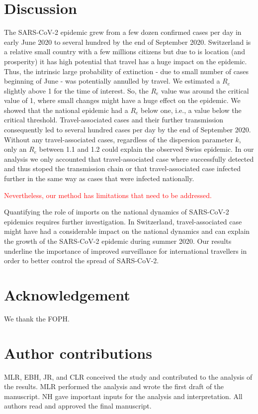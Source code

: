 \documentclass[10pt, a4paper, twoside]{article}
\begin{document}
\begin{multicols}{2}

\section{Discussion}
The SARS-CoV-2 epidemic grew from a few dozen confirmed cases per day in early June 2020 to several hundred by the end of September 2020. 
Switzerland is a relative small country with a few millions citizens but due to is location (and prosperity) it has high potential that travel has a huge impact on the epidemic. 
Thus, the intrinsic large probability of extinction - due to small number of cases beginning of June - was potentially annulled by travel. 
We estimated a $R_e$ slightly above 1 for the time of interest. So, the $R_e$ value was around the critical value of 1, where small changes might have a huge effect on the epidemic. 
We showed that the national epidemic had a $R_e$ below one, i.e., a value below the critical threshold. 
Travel-associated cases and their further transmission consequently led to several hundred cases per day by the end of September 2020. 
Without any travel-associated cases, regardless of the dispersion parameter $k$, only an $R_e$ between 1.1 and 1.2 could explain the observed Swiss epidemic. 
In our analysis we only accounted that travel-associated case where successfully detected and thus stoped the transmission chain or that travel-associated case infected further in the same way as cases that were infected nationally.

\textcolor{red}{Nevertheless, our method has limitations that need to be addressed.}

Quantifying the role of imports on the national dynamics of SARS-CoV-2 epidemics requires further investigation. 
In Switzerland, travel-associated case might have had a considerable impact on the national dynamics and can explain the growth of the SARS-CoV-2 epidemic during summer 2020. 
Our results underline the importance of improved surveillance for international travellers in order to better control the spread of SARS-CoV-2.

\section{Acknowledgement}
We thank the FOPH.

\section{Author contributions}
MLR, EBH, JR, and CLR conceived the study and contributed to the analysis of the results. MLR performed the analysis and wrote the first draft of the manuscript. NH gave important inputs for the analysis and interpretation. All authors read and approved the final manuscript.


\end{multicols}
\end{document}
